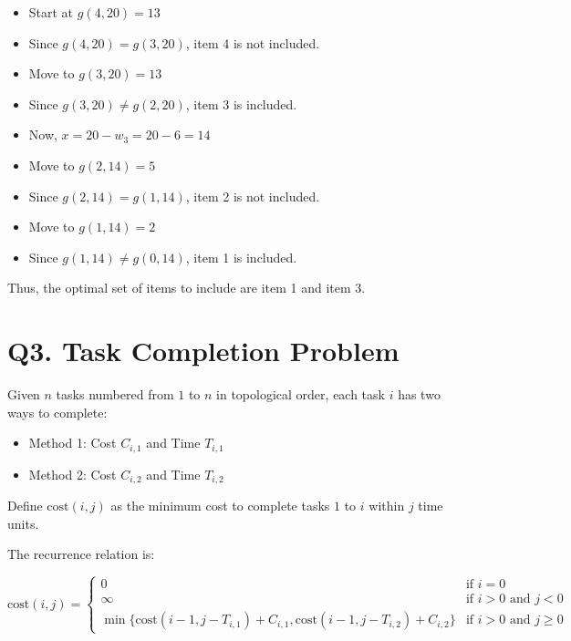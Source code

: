 \documentclass{article}
\begin{document}
\begin{itemize}
    \item Start at \( g(4, 20) = 13 \)
    \item Since \( g(4, 20) = g(3, 20) \), item 4 is not included.
    \item Move to \( g(3, 20) = 13 \)
    \item Since \( g(3, 20) \neq g(2, 20) \), item 3 is included.
    \item Now, \( x = 20 - w_3 = 20 - 6 = 14 \)
    \item Move to \( g(2, 14) = 5 \)
    \item Since \( g(2, 14) = g(1, 14) \), item 2 is not included.
    \item Move to \( g(1, 14) = 2 \)
    \item Since \( g(1, 14) \neq g(0, 14) \), item 1 is included.
\end{itemize}

Thus, the optimal set of items to include are item 1 and item 3.


\section{Q3. Task Completion Problem}

Given \( n \) tasks numbered from \( 1 \) to \( n \) in topological order, each task \( i \) has two ways to complete:
\begin{itemize}
    \item Method 1: Cost \( C_{i,1} \) and Time \( T_{i,1} \)
    \item Method 2: Cost \( C_{i,2} \) and Time \( T_{i,2} \)
\end{itemize}

Define \( \text{cost}(i, j) \) as the minimum cost to complete tasks \( 1 \) to \( i \) within \( j \) time units.

The recurrence relation is:

\[
    \text{cost}(i, j) =
    \begin{cases}
        0                                                                                        & \text{if } i = 0                       \\
        \infty                                                                                   & \text{if } i > 0 \text{ and } j < 0    \\
        \min\{\text{cost}(i-1, j - T_{i,1}) + C_{i,1}, \text{cost}(i-1, j - T_{i,2}) + C_{i,2}\} & \text{if } i > 0 \text{ and } j \geq 0
    \end{cases}
\]
\end{document}
